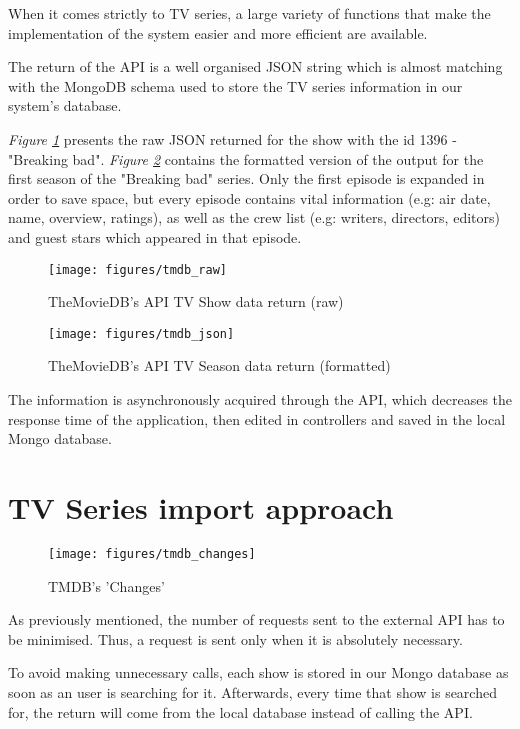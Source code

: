 When it comes strictly to TV series, a large variety of functions that make the implementation of the system easier and more efficient are available.

The return of the API is a well organised JSON string which is almost matching with the MongoDB schema used to store the TV series information in our system's database.

\textit{Figure \ref{fig:tmdbraw}} presents the raw JSON returned for the show with the id 1396 - "Breaking bad". \textit{Figure \ref{fig:tmdbjson}} contains the formatted version of the output for the first season of the "Breaking bad" series. Only the first episode is expanded in order to save space, but every episode contains vital information (e.g: air date, name, overview, ratings), as well as the crew list (e.g: writers, directors, editors) and guest stars which appeared in that episode.

\begin{figure}[h]
\caption{TheMovieDB's API TV Show data return (raw)}
\centering
\texttt{[image: figures/tmdb\_raw]}
\label{fig:tmdbraw}
\end{figure}

\begin{figure}[h]
\caption{TheMovieDB's API TV Season data return (formatted)}
\centering
\texttt{[image: figures/tmdb\_json]}
\label{fig:tmdbjson}
\end{figure}

The information is asynchronously acquired through the API, which decreases the response time of the application, then edited in controllers and saved in the local Mongo database.

\section{TV Series import approach}

\begin{wrapfigure}{L}{0.25\textwidth}
\centering
\texttt{[image: figures/tmdb\_changes]}
\caption{TMDB's 'Changes'}
\vspace{-2em}
\label{fig:tmdbchanges}
\end{wrapfigure}

As previously mentioned, the number of requests sent to the external API has to be minimised. Thus, a request is sent only when it is absolutely necessary.

To avoid making unnecessary calls, each show is stored in our Mongo database as soon as an user is searching for it. Afterwards, every time that show is searched for, the return will come from the local database instead of calling the API.

